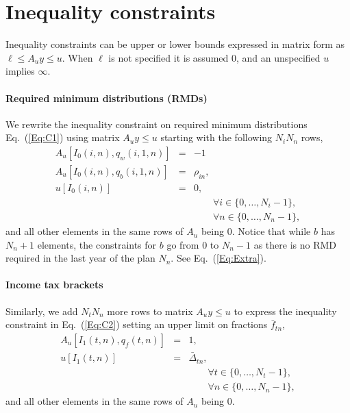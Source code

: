 \documentclass{report}[fleqn,11pt]
\begin{document}
\section{Inequality constraints}
Inequality constraints can be upper or lower bounds expressed in matrix form as
$\ell \le A_{u}y \le u$. When $\ell$ is not specified it is assumed 0, and
an unspecified $u$ implies $\infty$.

\paragraph*{Required minimum distributions (RMDs)}
We rewrite the inequality constraint on required minimum distributions
Eq.~(\ref{Eq:C1}) using matrix $A_{u}y \le u$ starting with the following $N_iN_n$ rows, 
\begin{eqnarray}
	A_u[I_0(i, n), q_w(i, 1, n)] &=& -1 \nonumber \\
	A_u[I_0(i, n), q_b(i, 1, n)] &=& \rho_{in}, \nonumber \\
	u[I_0(i, n)] &=& 0, \\
	&&\qquad\forall i \in \{0,\ldots, N_i - 1\}, \nonumber\\
	&&\qquad\forall n \in \{0,\ldots, N_n - 1\},\nonumber
\end{eqnarray}
and all other elements in the same rows of $A_u$ being $0$.
Notice that while $b$ has $N_n+1$ elements, the constraints
for $b$ go from $0$ to $N_n-1$ as there is no RMD required in the last year of the plan $N_n$.
See Eq.~(\ref{Eq:Extra}).

\paragraph*{Income tax brackets}
Similarly, we add $N_t N_n$ more rows to matrix $A_uy \le u$ to express
the inequality constraint in Eq.~(\ref{Eq:C2})
setting an upper limit on fractions $\bar{f}_{tn}$,
\begin{eqnarray}
	A_u[I_1(t, n), q_{f}(t, n)] &=& 1, \nonumber \\
	u[I_1(t, n)] &=& \bar{\Delta}_{tn},\\
	&&\qquad\forall t \in \{0,\ldots, N_t - 1\}, \nonumber\\
	&&\qquad\forall n \in \{0,\ldots, N_n - 1\},\nonumber
\end{eqnarray}
and all other elements in the same rows of $A_u$ being $0$.
\end{document}
